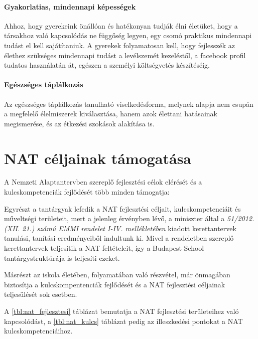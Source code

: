 \paragraph{Gyakorlatias, mindennapi képességek}

Ahhoz, hogy gyerekeink önállóan és hatékonyan tudják élni életüket, hogy a társakhoz való kapcsolódás ne függőség legyen, egy csomó praktikus mindennapi tudást el kell sajátítaniuk. A gyerekek folyamatosan kell, hogy fejlesszék az élethez szükséges mindennapi tudást a levélszemét kezeléstől, a facebook profil tudatos használatán át, egészen a személyi költségvetés készítéséig.

\paragraph{Egészséges táplálkozás}

Az egészséges táplálkozás tanulható viselkedésforma, melynek alapja nem csupán a megfelelő élelmiszerek kiválasztása, hanem azok élettani hatásainak megismerése, és az étkezési szokások alakítása is.

\section{NAT céljainak támogatása}

A Nemzeti Alaptantervben szereplő fejlesztési célok elérését és a kulcskompetenciák fejlődését több minden támogatja:

Egyrészt a tantárgyak lefedik a NAT fejlesztési céljait, kulcskompetenciáit és műveltségi területeit, mert a jelenleg érvényben lévő, a miniszter által a \emph{51/2012. (XII. 21.) számú EMMI rendelet I-IV. mellékletében} kiadott kerettantervek \citep{ofi:kerettanterv} tanulási, tanítási eredményeiből indultunk ki. Mivel a rendeletben szereplő kerettantervek teljesítik a NAT feltételeit, így a Budapest School tantárgystruktúrája is teljesíti ezeket.

Másrészt az iskola életében, folyamatában való részvétel, már önmagában biztosítja a kulcskompentenciák fejlődését és a NAT fejlesztési céljainak teljesülését sok esetben.

A \ref{tbl:nat_fejlesztesi} táblázat bemutatja a NAT fejlesztési területeihez való kapcsolódást, a
\ref{tbl:nat_kulcs} táblázat pedig az illeszkedési pontokat a NAT kulcskompetenciáihoz.

